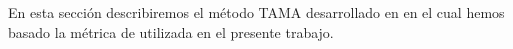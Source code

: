 En esta sección describiremos el método TAMA desarrollado en \cite{KOU2008} en el cual hemos basado la métrica de \entrainment utilizada en el presente trabajo.



